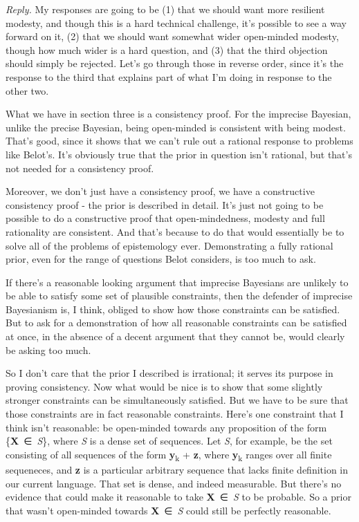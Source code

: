 \documentclass[
  10pt,
  letterpaper,
  DIV=11,
  numbers=noendperiod,
  twoside]{scrartcl}
\begin{document}
\emph{Reply.} My responses are going to be (1) that we should want more
resilient modesty, and though this is a hard technical challenge, it's
possible to see a way forward on it, (2) that we should want somewhat
wider open-minded modesty, though how much wider is a hard question, and
(3) that the third objection should simply be rejected. Let's go through
those in reverse order, since it's the response to the third that
explains part of what I'm doing in response to the other two.

What we have in section three is a consistency proof. For the imprecise
Bayesian, unlike the precise Bayesian, being open-minded is consistent
with being modest. That's good, since it shows that we can't rule out a
rational response to problems like Belot's. It's obviously true that the
prior in question isn't rational, but that's not needed for a
consistency proof.

Moreover, we don't just have a consistency proof, we have a constructive
consistency proof - the prior is described in detail. It's just not
going to be possible to do a constructive proof that open-mindedness,
modesty and full rationality are consistent. And that's because to do
that would essentially be to solve all of the problems of epistemology
ever. Demonstrating a fully rational prior, even for the range of
questions Belot considers, is too much to ask.

If there's a reasonable looking argument that imprecise Bayesians are
unlikely to be able to satisfy some set of plausible constraints, then
the defender of imprecise Bayesianism is, I think, obliged to show how
those constraints can be satisfied. But to ask for a demonstration of
how all reasonable constraints can be satisfied at once, in the absence
of a decent argument that they cannot be, would clearly be asking too
much.

So I don't care that the prior I described is irrational; it serves its
purpose in proving consistency. Now what would be nice is to show that
some slightly stronger constraints can be simultaneously satisfied. But
we have to be sure that those constraints are in fact reasonable
constraints. Here's one constraint that I think isn't reasonable: be
open-minded towards any proposition of the form
\{\textbf{X}~∈~\emph{S}\}, where \emph{S} is a dense set of sequences.
Let \emph{S}, for example, be the set consisting of all sequences of the
form \textbf{y}\textsubscript{k} + \textbf{z}, where
\textbf{y}\textsubscript{k} ranges over all finite sequeneces, and
\textbf{z} is a particular arbitrary sequence that lacks finite
definition in our current language. That set is dense, and indeed
measurable. But there's no evidence that could make it reasonable to
take \textbf{X}~∈~\emph{S} to be probable. So a prior that wasn't
open-minded towards \textbf{X}~∈~\emph{S} could still be perfectly
reasonable.
\end{document}
